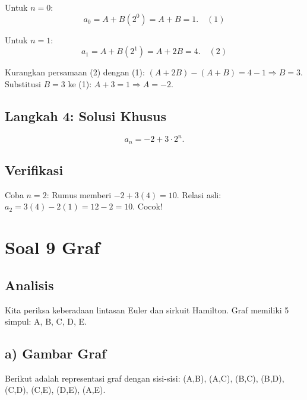 \documentclass[12pt,a4paper]{article}
\begin{document}
Untuk $n=0$:
\[
a_0 = A + B(2^0) = A + B = 1. \quad (1)
\]

Untuk $n=1$:
\[
a_1 = A + B(2^1) = A + 2B = 4. \quad (2)
\]

Kurangkan persamaan (2) dengan (1):
$(A + 2B) - (A + B) = 4 - 1 \Rightarrow B = 3$.
Substitusi $B=3$ ke (1): $A + 3 = 1 \Rightarrow A = -2$.

\subsection*{Langkah 4: Solusi Khusus}
\[
\boxed{a_n = -2 + 3 \cdot 2^n}.
\]

\subsection*{Verifikasi}
Coba $n=2$: Rumus memberi $-2 + 3(4) = 10$. Relasi asli: $a_2 = 3(4) - 2(1) = 12 - 2 = 10$. Cocok! 

\newpage
\section*{Soal 9 Graf}
\subsection*{Analisis}
Kita periksa keberadaan lintasan Euler dan sirkuit Hamilton. Graf memiliki 5 simpul: A, B, C, D, E.

\subsection*{a) Gambar Graf}
Berikut adalah representasi graf dengan sisi-sisi: (A,B), (A,C), (B,C), (B,D), (C,D), (C,E), (D,E), (A,E).

\begin{center}
\end{center}
\end{document}
